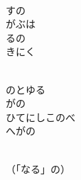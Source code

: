 \documentclass[10pt,b5j]{tarticle} %
\begin{document}
\begin{enumerate}
\begin{minipage}[c]{\blocksize}
    \end{minipage}
    \begin{minipage}[c]{\blocksize}
        
        \vspace{\linespace}
        \item~\\
        すの\\
        がぶは\\
        るの\\
        きにく
        
    \end{minipage}
    \begin{minipage}[c]{\blocksize}
        
        \vspace{\linespace}
        \item~\\
        のとゆる\\
        がの\\
        ひてにしこのべ\\
        へがの
        
    \end{minipage}
    \begin{minipage}[c]{\blocksize}
        
        \vspace{\linespace}
        \item~\\
        （「なる」の）
    
    \end{minipage}
\end{enumerate} %
\end{document}
